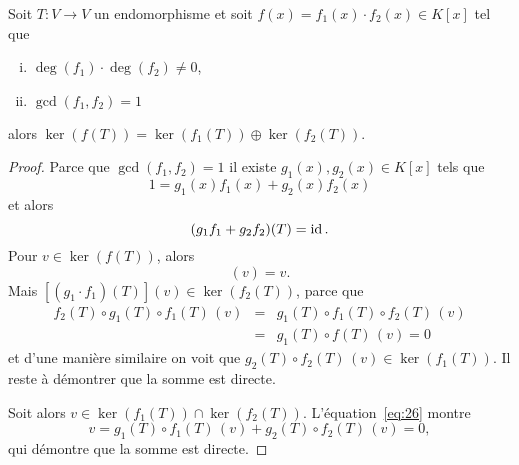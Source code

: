 \begin{theorem}
  \label{thr:37}
  Soit $T: V \rightarrow V$ un endomorphisme et soit $f(x) = f_1(x) \cdot f_2(x) ∈ K[x]$ tel que
  \begin{enumerate}[i)]
  \item $\deg(f_1) \cdot \deg(f_2) \neq 0$,
  \item $\gcd(f_1,f_2) = 1$ 
  \end{enumerate}
  alors 
  $
      \ker(f(T)) = \ker(f_1(T)) \oplus \ker(f_2(T)) 
   $.   
\end{theorem}
\begin{proof}
  Parce que $\gcd(f_1,f_2)=1$ il existe $g_1(x),g_2(x) ∈ K[x]$ tels que 
  \begin{displaymath}
    1 = g_1(x) f_1(x) + g_2(x) f_2(x)
  \end{displaymath}
  et alors 
  \begin{equation}
    \label{eq:26}   
    (g_1 f_1 +  g_2  f_2)(T) = \operatorname{id}. 
  \end{equation}
  Pour $v \in \ker(f(T))$, alors 
\begin{displaymath}
  [( g_1  f_1  + g_2 f_2)(T)]  (v)  = v. 
\end{displaymath}
Mais $[(g_1 \cdot f_1)(T)] ( v) \in \ker(f_2(T))$, parce que  
\begin{eqnarray*}
  f_2(T) \circ  g_1(T) \circ f_1(T)\, ( v)  & = &    g_1(T) \circ f_1(T) \circ f_2(T) \,( v) \\
                                          &  =&  g_1(T) \circ f(T) \, (v) = 0
\end{eqnarray*}
et d'une manière similaire on voit que $g_2(T)\circ  f_2(T) \, (v) \in \ker(f_1(T))$. Il reste à démontrer que la somme est directe. 

Soit alors $v ∈  \ker(f_1(T))  ∩  \ker(f_2(T))$.  L'équation~\eqref{eq:26} montre 
\begin{displaymath}
  v =  g_1(T) \circ f_1(T)\, (v) +  g_2(T) \circ f_2(T)\, ( v) = 0,
\end{displaymath}
qui démontre que la somme est directe. 
\end{proof}



